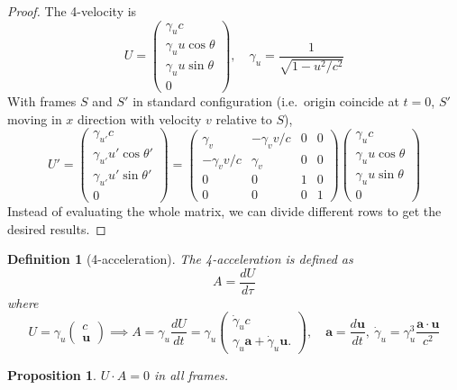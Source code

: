 \documentclass[a4paper]{article}
\theoremstyle{new}
\newtheorem{defi}{Definition}[section]
\newtheorem{prop}{Proposition}[section]
\begin{document}
\begin{proof}
The 4-velocity is
$$U =
  \begin{pmatrix}
    \gamma_u c\\
    \gamma_u u\cos \theta\\
    \gamma_u u\sin \theta\\
    0
  \end{pmatrix}, \quad \gamma_u = \frac{1}{\sqrt{1 - u^2/c^2}}$$
With frames $S$ and $S'$ in standard configuration (i.e.\ origin coincide at $t = 0$, $S'$ moving in $x$ direction with velocity $v$ relative to $S$),
\[
  U' = \begin{pmatrix}
    \gamma_{u'} c\\
    \gamma_{u'} u'\cos \theta'\\
    \gamma_{u'} u'\sin \theta'\\
    0
  \end{pmatrix}
  =
  \begin{pmatrix}
    \gamma_v & -\gamma_v v/c & 0 & 0\\
    -\gamma_{v} v/c & \gamma_v & 0 & 0\\
    0 & 0 & 1 & 0\\
    0 & 0 & 0 & 1
  \end{pmatrix}
  \begin{pmatrix}
    \gamma_u c\\
    \gamma_u u\cos \theta\\
    \gamma_u u\sin \theta\\
    0
  \end{pmatrix}
\]
Instead of evaluating the whole matrix, we can divide different rows to get the desired results.
\end{proof}
\begin{defi}[4-acceleration]
The 4-acceleration is defined as
$$ A = \frac{d U}{d \tau}$$
where
$$U = \gamma_u
  \begin{pmatrix}
    c\\
    \mathbf{u}
  \end{pmatrix}
\implies A = \gamma_u \frac{d U}{d t} = \gamma_u
  \begin{pmatrix}
    \dot{\gamma}_u c\\
    \gamma_u \mathbf{a} + \dot{\gamma}_u \mathbf{u}.
  \end{pmatrix},\quad
\mathbf{\mathbf{a}} = \frac{d \mathbf{u}}{d t},~\dot{\gamma}_u = \gamma_u^3 \frac{\mathbf{a}\cdot \mathbf{u}}{c^2}$$
\end{defi}
\begin{prop}
$U\cdot A=0$ in all frames.
\end{prop}
\end{document}
